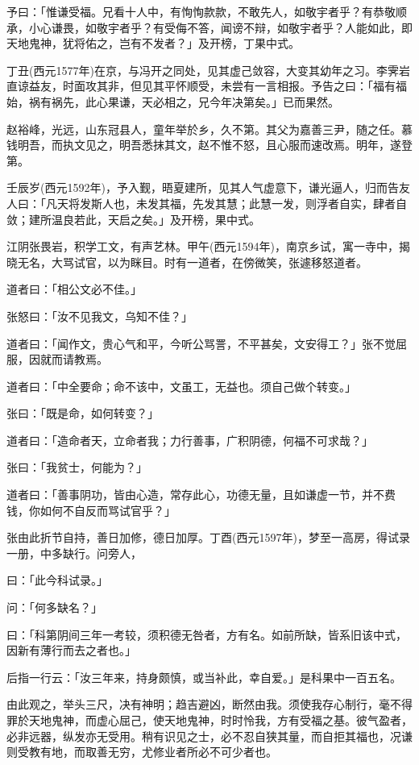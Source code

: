 \documentclass[letterpaper,12pt,english]{sphinxmanual}
\begin{document}
予曰：「惟谦受福。兄看十人中，有恂恂款款，不敢先人，如敬宇者乎？有恭敬顺承，小心谦畏，如敬宇者乎？有受侮不答，闻谤不辩，如敬宇者乎？人能如此，即天地鬼神，犹将佑之，岂有不发者？」及开榜，丁果中式。

丁丑(西元1577年)在京，与冯开之同处，见其虚己敛容，大变其幼年之习。李霁岩直谅益友，时面攻其非，但见其平怀顺受，未尝有一言相报。予告之曰：「福有福始，祸有祸先，此心果谦，天必相之，兄今年决第矣。」已而果然。

赵裕峰，光远，山东冠县人，童年举於乡，久不第。其父为嘉善三尹，随之任。慕钱明吾，而执文见之，明吾悉抹其文，赵不惟不怒，且心服而速改焉。明年，遂登第。

壬辰岁(西元1592年)，予入觐，晤夏建所，见其人气虚意下，谦光逼人，归而告友人曰：「凡天将发斯人也，未发其福，先发其慧；此慧一发，则浮者自实，肆者自敛；建所温良若此，天启之矣。」及开榜，果中式。

江阴张畏岩，积学工文，有声艺林。甲午(西元1594年)，南京乡试，寓一寺中，揭晓无名，大骂试官，以为眯目。时有一道者，在傍微笑，张遽移怒道者。

道者曰：「相公文必不佳。」

张怒曰：「汝不见我文，乌知不佳？」

道者曰：「闻作文，贵心气和平，今听公骂詈，不平甚矣，文安得工？」张不觉屈服，因就而请教焉。

道者曰：「中全要命；命不该中，文虽工，无益也。须自己做个转变。」

张曰：「既是命，如何转变？」

道者曰：「造命者天，立命者我；力行善事，广积阴德，何福不可求哉？」

张曰：「我贫士，何能为？」

道者曰：「善事阴功，皆由心造，常存此心，功德无量，且如谦虚一节，并不费钱，你如何不自反而骂试官乎？」

张由此折节自持，善日加修，德日加厚。丁酉(西元1597年)，梦至一高房，得试录一册，中多缺行。问旁人，

曰：「此今科试录。」

问：「何多缺名？」

曰：「科第阴间三年一考较，须积德无咎者，方有名。如前所缺，皆系旧该中式，因新有薄行而去之者也。」

后指一行云：「汝三年来，持身颇慎，或当补此，幸自爱。」是科果中一百五名。

由此观之，举头三尺，决有神明；趋吉避凶，断然由我。须使我存心制行，毫不得罪於天地鬼神，而虚心屈己，使天地鬼神，时时怜我，方有受福之基。彼气盈者，必非远器，纵发亦无受用。稍有识见之士，必不忍自狭其量，而自拒其福也，况谦则受教有地，而取善无穷，尤修业者所必不可少者也。
\end{document}
